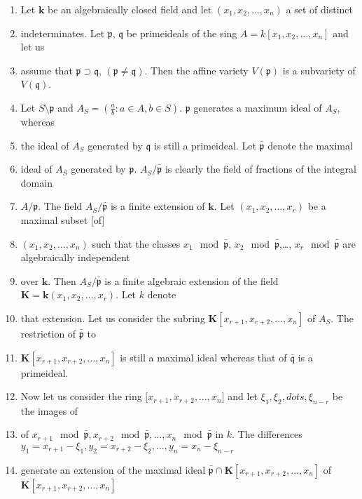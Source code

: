 \documentclass[12pt]{amsart}
\begin{document}
\begin{enumerate}
\item Let $\mathbf{k}$ be an algebraically closed field and let $(x_1,x_2,\dots,x_n)$ a set of distinct
\item indeterminates. Let ${\mathfrak{p}}$, ${\mathfrak{q}}$ be primeideals of the sing $A=k[x_1,x_2,\dots,x_n]$ and let us
\item assume that ${\mathfrak{p}} \supset {\mathfrak{q}}$, $({\mathfrak{p}}\not={\mathfrak{q}})$. Then the affine variety $V({\mathfrak{p}})$ is a subvariety of $V({\mathfrak{q}})$.
\item
Let $S\setminus {\mathfrak{p}}$ and $A_S=\left( \frac{a}{b}:a\in A, b\in S\right)$. ${\mathfrak{p}}$ generates a maximum ideal of $A_S$, whereas
\item
the ideal of $A_S$ generated by ${\mathfrak{q}}$ is still a primeideal. Let $\bar{\mathfrak{p}}$ denote the maximal
\item
ideal of $A_S$ generated by ${\mathfrak{p}}$.  $A_S/\bar{\mathfrak{p}}$ is clearly the field of fractions of the integral domain
\item
$A/{\mathfrak{p}}$. The field $A_S/\bar{\mathfrak{p}}$ is a finite extension of $\mathbf{k}$. Let $(x_1,x_2,\dots,x_r)$ be a maximal subset [of]
\item
$(x_1,x_2,\dots,x_n)$ such that the classes $x_1 \mod \bar{\mathfrak{p}}$, $x_2 \mod \bar{\mathfrak{p}}$,\dots, $x_r \mod \bar{\mathfrak{p}}$ are algebraically independent
\item
over $\mathbf{k}$. Then $A_S/\bar{\mathfrak{p}}$ is a finite algebraic extension of the field $\mathbf{K}=\mathbf{k}(x_1,x_2,\dots,x_r)$. Let $\mathit{k}$ denote
\item
that extension. Let us consider the subring $\mathbf{K}[x_{r+1},x_{r+2},\dots,x_n]$ of $A_S$. The restriction of $\bar{\mathfrak{p}}$ to
\item
$\mathbf{K}[x_{r+1},x_{r+2},\dots,x_n]$ is still a maximal ideal whereas that of $\bar{\mathfrak{q}}$ is a primeideal.
\item
Now let us consider the ring $\mathit[x_{r+1},x_{r+2},\dots,x_n]$ and let $\xi_1,\xi_2,dots,\xi_{n-r}$ be the images of
\item
of $x_{r+1}\mod \bar{\mathfrak{p}},x_{r+2}\mod\bar{\mathfrak{p}},\dots,x_n\mod \bar{\mathfrak{p}}$ in $\mathit{k}$. The differences $y_1=x_{r+1}-\xi_1,y_2=x_{r+2}-\xi_2,\dots, y_n=x_n-\xi_{n-r}$
\item
generate an extension of the maximal ideal $\bar{\mathfrak{p}}\cap \mathbf{K}[x_{r+1},x_{r+2},\dots,x_n]$ of $\mathbf{K}[x_{r+1},x_{r+2},\dots,x_n]$

\end{enumerate}
\end{document}
